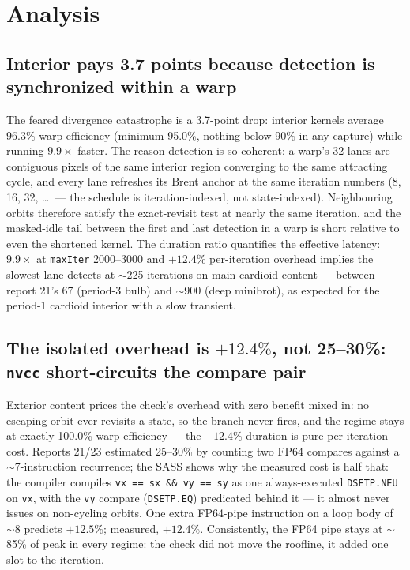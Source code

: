 \documentclass[
	english,
	letterpaper, oneside
]{article}
\begin{document}
\section{Analysis}
\label{sec:analysis}

\subsection{Interior pays 3.7 points because detection is synchronized
within a warp}

The feared divergence catastrophe is a 3.7-point drop: interior kernels
average 96.3\% warp efficiency (minimum 95.0\%, nothing below 90\% in any
capture) while running $9.9\times$ faster. The reason detection is so
coherent: a warp's 32 lanes are contiguous pixels of the same interior
region converging to the same attracting cycle, and every lane refreshes
its Brent anchor at the same iteration numbers (8, 16, 32, \ldots\
--- the schedule is iteration-indexed, not state-indexed). Neighbouring
orbits therefore satisfy the exact-revisit test at nearly the same
iteration, and the masked-idle tail between the first and last detection
in a warp is short relative to even the shortened kernel. The duration
ratio quantifies the effective latency: $9.9\times$ at
\texttt{maxIter} 2000--3000 and $+12.4\%$ per-iteration overhead implies
the slowest lane detects at $\sim$225 iterations on main-cardioid content
--- between report 21's 67 (period-3 bulb) and $\sim$900 (deep minibrot),
as expected for the period-1 cardioid interior with a slow transient.

\subsection{The isolated overhead is $+12.4\%$, not 25--30\%: \texttt{nvcc}
short-circuits the compare pair}

Exterior content prices the check's overhead with zero benefit mixed in:
no escaping orbit ever revisits a state, so the branch never fires, and
the regime stays at exactly 100.0\% warp efficiency --- the $+12.4\%$
duration is pure per-iteration cost. Reports 21/23 estimated 25--30\% by
counting two FP64 compares against a $\sim$7-instruction recurrence; the
SASS shows why the measured cost is half that: the compiler compiles
\texttt{vx == sx \&\& vy == sy} as one always-executed
\texttt{DSETP.NEU} on \texttt{vx}, with the \texttt{vy} compare
(\texttt{DSETP.EQ}) predicated behind it --- it almost never issues on
non-cycling orbits. One extra FP64-pipe instruction on a loop body of
$\sim$8 predicts $+12.5\%$; measured, $+12.4\%$. Consistently, the FP64
pipe stays at $\sim$85\% of peak in every regime: the check did not move
the roofline, it added one slot to the iteration.
\end{document}
